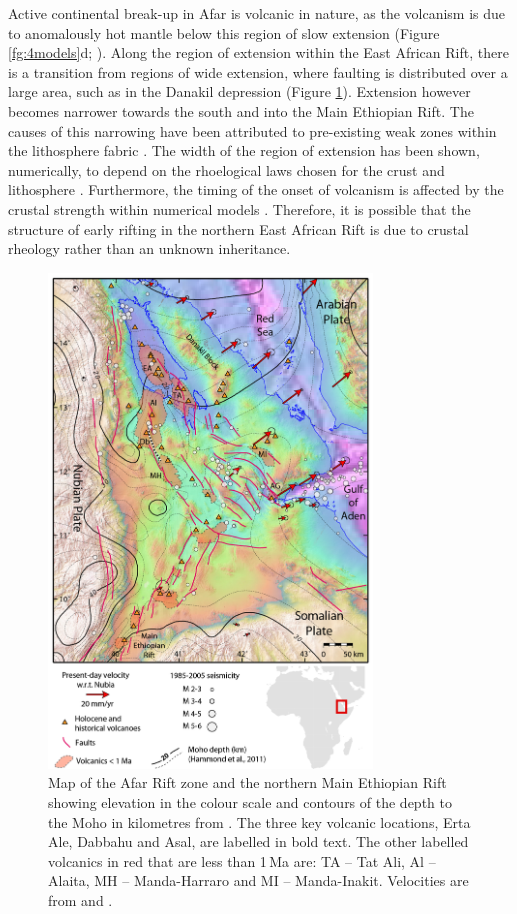 Active continental break-up in Afar is volcanic in nature, as the volcanism is due to anomalously hot mantle below this region of slow extension (Figure \ref{fg:4models}d; \citealp{armitage-etal-epsl-2015}). Along the region of extension within the East African Rift, there is a transition from regions of wide extension, where faulting is distributed over a large area, such as in the Danakil depression (Figure \ref{fg:afar-map}). Extension however becomes narrower towards the south and into the Main Ethiopian Rift. The causes of this narrowing have been attributed to pre-existing weak zones within the lithosphere fabric \citep{keranen-etal-2009}. The width of the region of extension has been shown, numerically, to depend on the rhoelogical laws chosen for the crust and lithosphere \citep[e.g.][]{buck-1991,brun-1999,brune-etal-2017}. Furthermore, the timing of the onset of volcanism is affected by the crustal strength within numerical models \citep{ros-etal-2017}. Therefore, it is possible that the structure of early rifting in the northern East African Rift is due to crustal rheology rather than an unknown inheritance.

\begin{figure}
\centering
\includegraphics[width=8.6cm]{./figures/ch2-afar-map.png}
\caption{Map of the Afar Rift zone and the northern Main Ethiopian Rift showing elevation in the colour scale and contours of the depth to the Moho in kilometres from \cite{hammond-etal-2011}. The three key volcanic locations, Erta Ale, Dabbahu and Asal, are labelled in bold text. The other labelled volcanics in red that are less than 1\,Ma are: TA – Tat Ali, Al – Alaita, MH – Manda-Harraro and MI – Manda-Inakit. Velocities are from \cite{nooner-etal-2009} and \cite{reilinger-2011}.}
\label{fg:afar-map}
\end{figure}

